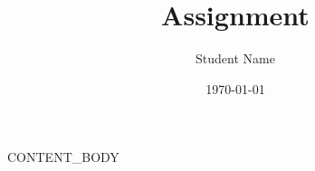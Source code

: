 \documentclass[11pt]{article}
\title{Assignment}
\author{Student Name}
\date{\today}
\begin{document}
\maketitle

{{CONTENT_BODY}}
\end{document}
